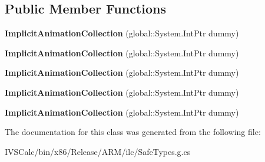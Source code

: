 \subsection*{Public Member Functions}
\begin{DoxyCompactItemize}
\item 
\mbox{\label{class_windows_1_1_u_i_1_1_composition_1_1_implicit_animation_collection_a50c120c904f42e28927107c1d94a8cd5}} 
{\bfseries Implicit\+Animation\+Collection} (global\+::\+System.\+Int\+Ptr dummy)
\item 
\mbox{\label{class_windows_1_1_u_i_1_1_composition_1_1_implicit_animation_collection_a50c120c904f42e28927107c1d94a8cd5}} 
{\bfseries Implicit\+Animation\+Collection} (global\+::\+System.\+Int\+Ptr dummy)
\item 
\mbox{\label{class_windows_1_1_u_i_1_1_composition_1_1_implicit_animation_collection_a50c120c904f42e28927107c1d94a8cd5}} 
{\bfseries Implicit\+Animation\+Collection} (global\+::\+System.\+Int\+Ptr dummy)
\item 
\mbox{\label{class_windows_1_1_u_i_1_1_composition_1_1_implicit_animation_collection_a50c120c904f42e28927107c1d94a8cd5}} 
{\bfseries Implicit\+Animation\+Collection} (global\+::\+System.\+Int\+Ptr dummy)
\item 
\mbox{\label{class_windows_1_1_u_i_1_1_composition_1_1_implicit_animation_collection_a50c120c904f42e28927107c1d94a8cd5}} 
{\bfseries Implicit\+Animation\+Collection} (global\+::\+System.\+Int\+Ptr dummy)
\end{DoxyCompactItemize}


The documentation for this class was generated from the following file\+:\begin{DoxyCompactItemize}
\item 
I\+V\+S\+Calc/bin/x86/\+Release/\+A\+R\+M/ilc/Safe\+Types.\+g.\+cs\end{DoxyCompactItemize}
